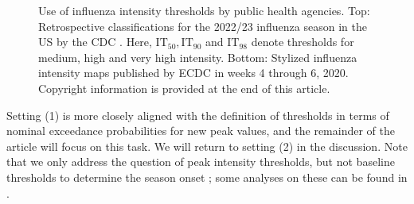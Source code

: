 \documentclass[12pt]{article}
\begin{document}
\begin{figure}[h!]
\begin{center}

\medskip

\end{center}
\caption{Use of influenza intensity thresholds by public health agencies. Top: Retrospective classifications for the 2022/23 influenza season in the US by the CDC \citep{White2023}. Here, $\text{IT}_{50}, \text{IT}_{90}$ and $\text{IT}_{98}$ denote thresholds for medium, high and very high intensity. Bottom: Stylized influenza intensity maps published by ECDC in weeks 4 through 6, 2020. Copyright information is provided at the end of this article.
}
\label{fig:maps}
\end{figure}


\noindent Setting (1) is more closely aligned with the definition of thresholds in terms of nominal exceedance probabilities for new peak values, and the remainder of the article will focus on this task. We will return to setting (2) in the discussion. Note that we only address the question of peak intensity thresholds, but not baseline thresholds to determine the season onset \citep{Vega2013}; some analyses on these can be found in \cite{Pang2023}.
\end{document}
